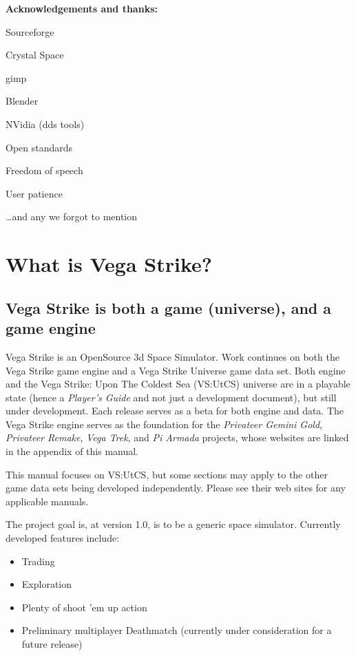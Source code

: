 \documentclass{article}
\begin{document}
\textbf{Acknowledgements and thanks:}

Sourceforge

Crystal Space

gimp

Blender

NVidia (dds tools)

Open standards

Freedom of speech

User patience

\dots  and any we forgot to mention

\section{ What is Vega Strike?}


\subsection{Vega Strike is both a game (universe), and a game engine}

Vega Strike is an OpenSource 3d Space Simulator. Work continues on both the Vega Strike game engine and a Vega Strike 
Universe game data set. Both engine and the Vega Strike: Upon The Coldest Sea (VS:UtCS) universe are in a playable state 
(hence a \textit{Player's Guide} and not just a development document), but still under development. Each release 
serves as a beta for both engine and data. The Vega Strike engine serves as the foundation for the \textit{Privateer Gemini 
Gold}, \textit{Privateer Remake}, \textit{Vega Trek}, and \textit{Pi Armada} projects, whose websites are linked in the appendix of this manual. 

This manual focuses on VS:UtCS, but some sections may apply to the other game data sets being developed independently. Please see their web sites for any applicable manuals.

The project goal is, at version 1.0, is to be a generic space simulator. Currently developed features include: 

\begin{itemize}
\item  Trading
\item  Exploration
\item  Plenty of shoot 'em up action
\item  Preliminary multiplayer Deathmatch (currently under consideration for a future release)
\end{itemize}
\end{document}
